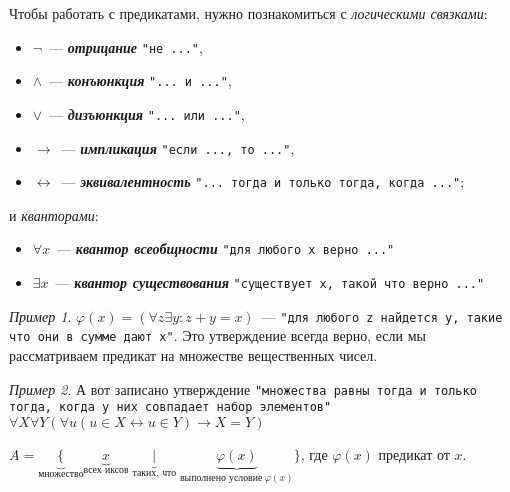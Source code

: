 \documentclass{article}
\theoremstyle{remark}
\newtheorem{example}{Пример}
\begin{document}
\begin{definition}
	Чтобы работать с предикатами, нужно познакомиться с \textit{логическими связками}:
	\begin{itemize}
		\item $\neg$~--- \textbf{\textit{отрицание}} \texttt{"не ..."},
	
		\item $\wedge$~--- \textbf{\textit{конъюнкция}}  \texttt{"... и ..."},
	
		\item $\vee$~--- \textbf{\textit{дизъюнкция}}  \texttt{"... или ..."},
	
		\item $\rightarrow$~--- \textbf{\textit{импликация}}  \texttt{"если ..., то ..."},
	
		\item $\leftrightarrow$~--- \textbf{\textit{эквивалентность}}  \texttt{"... тогда и только тогда, когда ..."};
	\end{itemize}
	и {\textit{кванторами}}:
	\begin{itemize}
		\item $\forall x$~--- \textbf{\textit{квантор всеобщности}}  \texttt{"для любого х верно ..."}
	
		\item $\exists x$~--- \textbf{\textit{квантор существования}}  \texttt{"существует х, такой что верно ..."}
	\end{itemize}
\end{definition}

\begin{example}
	$\varphi(x) = (\forall z \exists y: z + y = x)$~--- \texttt{"для любого z найдется y, такие что они в сумме дают x"}. Это утверждение всегда верно, если мы рассматриваем предикат на множестве вещественных чисел.
\end{example}

\begin{example}
	А вот записано утверждение \texttt{"множества равны тогда и только тогда, когда у них совпадает набор элементов"}
	$\forall X\forall Y(\forall u(u \in X \leftrightarrow u \in Y) \rightarrow X = Y)$
\end{example}

\begin{definition}
	$A = \underbrace{\{}_{\text{множество}}\underbrace{x}_{\text{всех иксов}} \underbrace{\mid}_{\text{таких, что}} \underbrace{\varphi(x)}_{\text{выполнено условие} \ \varphi(x)}\}$, где $\varphi(x)$ предикат от $x$.

\end{definition}
\end{document}
